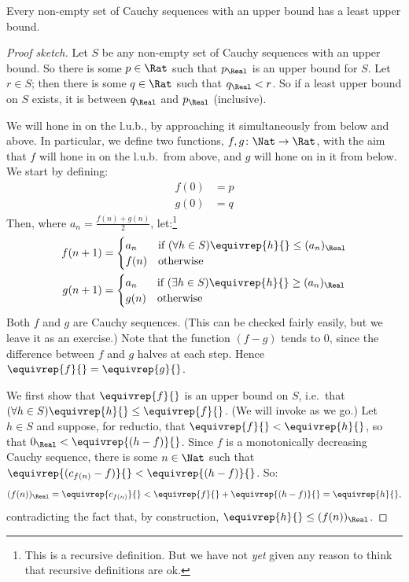 \begin{thm}
Every non-empty set of Cauchy sequences with an upper bound has a
least upper bound.
\end{thm}

\begin{proof}[Proof sketch] Let $S$ be any non-empty set of Cauchy
sequences with an upper bound. So there is some $p \in \Rat$ such that
$p_{\Real}$ is an upper bound for $S$. Let $r \in S$; then there is
some $q \in \Rat$ such that $q_{\Real} < r$. So if a least upper bound
on $S$ exists, it is between $q_\Real$ and $p_\Real$ (inclusive). 

We will hone in on the l.u.b., by approaching it simultaneously from
below and above. In particular, we define two functions, $f, g \colon
\Nat \to \Rat$, with the aim that $f$ will hone in on the l.u.b.\ from
above, and $g$ will hone on in it from below. We start by defining:
\begin{align*}
	f(0) &= p \\
	g(0) &= q
\end{align*}
Then, where $a_n = \frac{f(n) + g(n)}{2}$, let:\footnote{This is a
recursive definition. But we have not \emph{yet} given any reason to
think that recursive definitions are ok.}
\begin{align*}
	f(n+1) &=
	\begin{cases}
		a_n &\text{if }(\forall h \in S)\equivrep{h}{} \leq (a_n)_\Real\\
		f(n)&\text{otherwise}
	\end{cases}\\
	g(n+1) &=
	\begin{cases}
		a_n &\text{if }(\exists h \in S)\equivrep{h}{} \geq (a_n)_\Real\\
	 	g(n) &\text{otherwise}
	\end{cases}
\end{align*}
Both $f$ and $g$ are Cauchy sequences. (This can be checked fairly
easily, but we leave it as an exercise.) Note that the function $(f-g)$
tends to $0$, since the difference between $f$ and $g$ halves at each
step. Hence $\equivrep{f}{} = \equivrep{g}{}$. 

We first show that $\equivrep{f}{}$ is an upper bound on $S$, i.e.\ that $(\forall h \in S)\equivrep{h}{} \leq \equivrep{f}{}$.  
(We will invoke  as we go.) Let $h \in S$ and
suppose, for reductio, that $\equivrep{f}{} < \equivrep{h}{}$, so that
$0_\Real < \equivrep{(h-f)}{}$. Since $f$ is a monotonically
decreasing Cauchy sequence, there is some $n \in \Nat$ such that
$\equivrep{(c_{f(n)} - f)}{} < \equivrep{(h-f)}{}$. So:
\[
	(f(n))_\Real = \equivrep{c_{f(n)}}{} < \equivrep{f}{} + \equivrep{(h-f)}{} = \equivrep{h}{},
\]
contradicting the fact that, by construction, $\equivrep{h}{} \leq (f(n))_\Real$.


\end{proof}
